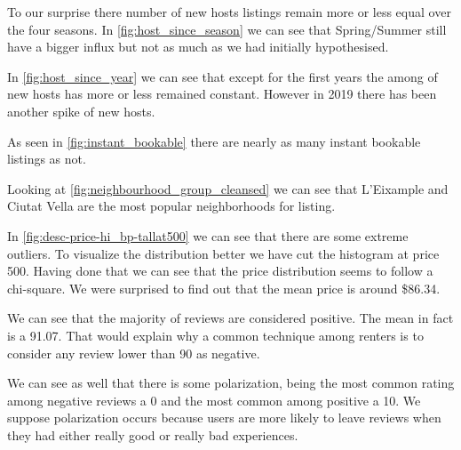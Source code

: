 
To our surprise there number of new hosts listings remain more or less equal over
the four seasons. In \cref{fig:host_since_season} we can see that Spring/Summer
still have a bigger influx but not as much as we had initially hypothesised.



In \cref{fig:host_since_year} we can see that except for the first years the
among of new hosts has more or less remained constant. However in 2019 there has
been another spike of new hosts.



As seen in \cref{fig:instant_bookable} there are nearly as many
instant bookable listings as not.







Looking at \cref{fig:neighbourhood_group_cleansed} we can see that
L'Eixample and Ciutat Vella are the most popular neighborhoods for listing.



In \cref{fig:desc-price-hi_bp-tallat500} we can see that there are some extreme
outliers. To visualize the distribution better we have cut the histogram at
price 500. Having done that we can see that the price distribution seems to
follow a chi-square. We were surprised to find out that the mean price is around
\$86.34.



We can see that the majority of reviews are considered positive. The mean in
fact is a 91.07. That would explain why a common technique among renters is to
consider any review lower than 90 as negative.

We can see as well that there is some polarization, being the most common rating
among negative reviews a 0 and the most common among positive a 10. We suppose
polarization occurs because users are more likely to leave reviews when they had
either really good or really bad experiences.


